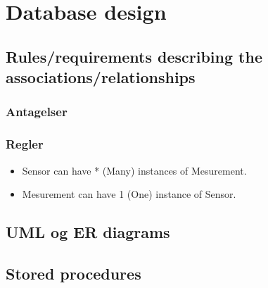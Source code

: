 \section{Database design}

\subsection{Rules/requirements describing the associations/relationships}

\subsubsection{Antagelser}

\subsubsection{Regler}

\begin{itemize}
	\item Sensor can have * (Many) instances of Mesurement.
	\item Mesurement can have 1 (One) instance of Sensor.
\end{itemize}

\subsection{UML og ER diagrams}


\subsection{Stored procedures}

